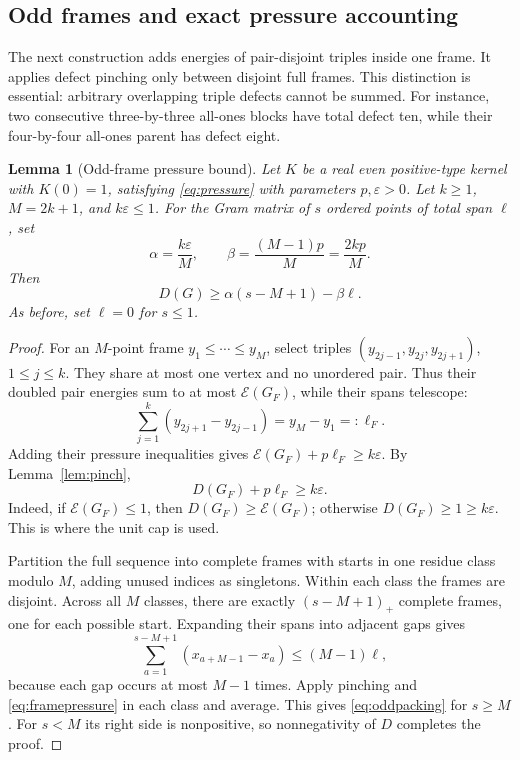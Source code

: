 \documentclass[11pt]{article}
\newtheorem{lemma}[theorem]{Lemma}
\theoremstyle{remark}
\newcommand{\cE}{\mathcal E}
\begin{document}
\subsection{Odd frames and exact pressure accounting}

The next construction adds energies of pair-disjoint triples inside one
frame. It applies defect pinching only between disjoint full frames. This
distinction is essential: arbitrary overlapping triple defects cannot be
summed. For instance, two consecutive three-by-three all-ones blocks have
total defect ten, while their four-by-four all-ones parent has defect eight.

\begin{lemma}[Odd-frame pressure bound]\label{lem:oddframe}
Let $K$ be a real even positive-type kernel with $K(0)=1$, satisfying
\eqref{eq:pressure} with parameters $p,\varepsilon>0$. Let $k\ge1$,
$M=2k+1$, and $k\varepsilon\le1$. For the Gram matrix of $s$ ordered
points of total span $\ell$, set
\[
 \alpha=\frac{k\varepsilon}{M},\qquad
 \beta=\frac{(M-1)p}{M}=\frac{2kp}{M}.
\]
Then
\begin{equation}\label{eq:oddpacking}
 D(G)\ge\alpha(s-M+1)-\beta\ell.
\end{equation}
As before, set $\ell=0$ for $s\le1$.
\end{lemma}
\begin{proof}
For an $M$-point frame $y_1\le\cdots\le y_M$, select triples
$(y_{2j-1},y_{2j},y_{2j+1})$, $1\le j\le k$. They share at most one
vertex and no unordered pair. Thus their doubled pair energies sum to at
most $\cE(G_F)$, while their spans telescope:
\[
 \sum_{j=1}^k(y_{2j+1}-y_{2j-1})=y_M-y_1=:\ell_F.
\]
Adding their pressure inequalities gives
$\cE(G_F)+p\ell_F\ge k\varepsilon$. By Lemma~\ref{lem:pinch},
\begin{equation}\label{eq:framepressure}
 D(G_F)+p\ell_F\ge k\varepsilon.
\end{equation}
Indeed, if $\cE(G_F)\le1$, then $D(G_F)\ge\cE(G_F)$; otherwise
$D(G_F)\ge1\ge k\varepsilon$. This is where the unit cap is used.

Partition the full sequence into complete frames with starts in one
residue class modulo $M$, adding unused indices as singletons. Within
each class the frames are disjoint. Across all $M$ classes, there are
exactly $(s-M+1)_+$ complete frames, one for each possible start. Expanding
their spans into adjacent gaps gives
\[
 \sum_{a=1}^{s-M+1}(x_{a+M-1}-x_a)\le(M-1)\ell,
\]
because each gap occurs at most $M-1$ times. Apply pinching and
\eqref{eq:framepressure} in each class and average. This gives
\eqref{eq:oddpacking} for $s\ge M$. For $s<M$ its right side is
nonpositive, so nonnegativity of $D$ completes the proof.
\end{proof}
\end{document}
